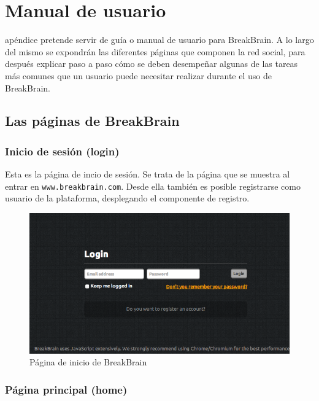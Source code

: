 \chapter{Manual de usuario}
\label{chap::manual}

 apéndice pretende servir de guía o manual de usuario para BreakBrain. A lo largo del mismo se expondrán las diferentes páginas que componen la red social, para después explicar paso a paso cómo se deben desempeñar algunas de las tareas más comunes que un usuario puede necesitar realizar durante el uso de BreakBrain.

\section{Las páginas de BreakBrain}

\subsection{Inicio de sesión (login)}

Esta es la página de incio de sesión. Se trata de la página que se muestra al entrar en {\tt www.breakbrain.com}. Desde ella también es posible registrarse como usuario de la plataforma, desplegando el componente de registro.

\begin{figure}[h]
  \begin{center}
    \includegraphics[width=\textwidth]{./images/page-login.png}
  \end{center}  
  \caption{Página de inicio de BreakBrain}
  \label{fig::page-login}
\end{figure}

\subsection{Página principal (home)}

